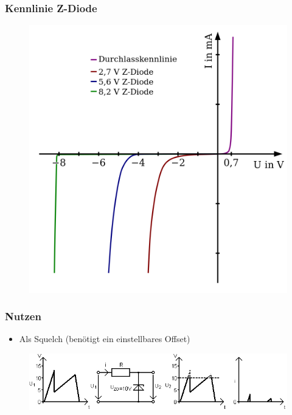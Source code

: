 \begin{frame}
    \frametitle{Kennlinie Z-Diode}
    \begin{center}
	\begin{figure}
        \includegraphics[width=\textwidth,height=.8\textheight,keepaspectratio]{e12/Kennlinie_Z-Diode.png}
	\end{figure}
	\end{center}
\end{frame}

\begin{frame}
    \frametitle{Nutzen}
      	\begin{itemize}
			\item Als Squelch (benötigt ein einstellbares Offset)
    \end{itemize}    
    \begin{center}
	\begin{figure}
        \includegraphics[width=.8\textwidth,height=.8\textheight,keepaspectratio]{e12/U-Stab-Z-Diode.jpg}
	\end{figure}
	\end{center}
\end{frame}

